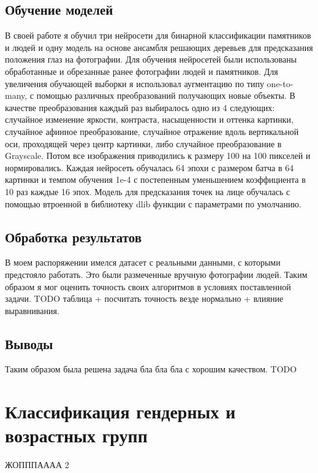 \documentclass[a4paper,14pt]{extarticle}
\begin{document}
    \subsection{Обучение моделей}
    В своей работе я обучил три нейросети для бинарной классификации памятников и людей и одну модель на основе ансамбля решающих деревьев для предсказания положения глаз на фотографии.
    Для обучения нейросетей были использованы обработанные и обрезанные ранее фотографии людей и памятников. Для увеличения обучающей выборки я использовал аугментацию по типу one-to-many, с помощью различных преобразований получающих новые объекты. В качестве преобразования каждый раз выбиралось одно из 4 следующих: случайное изменение яркости, контраста, насыщенности и оттенка картинки, случайное афинное преобразование, случайное отражение вдоль вертикальной оси, проходящей через центр картинки, либо случайное преобразование в Grayscale. Потом все изображения приводились к размеру 100 на 100 пикселей и нормировались.
    Каждая нейросеть обучалась 64 эпохи с размером батча в 64 картинки и темпом обучения 1e-4 с постепенным уменьшением коэффициента в 10 раз каждые 16 эпох.
    Модель для предсказания точек на лице обучалась с помощью втроенной в библиотеку dlib функции с параметрами по умолчанию.

    \subsection{Обработка результатов}
    В моем распоряжении имелся датасет с реальными данными, с которыми предстояло работать. Это были размеченные вручную фотографии людей. Таким образом я мог оценить точность своих алгоритмов в условиях поставленной задачи. TODO таблица + посчитать точность везде нормально + влияние выравнивания.

    \subsection{Выводы}
    Таким образом была решена задача бла бла бла с хорошим качеством. TODO

    \section{Классификация гендерных и возрастных групп}
    ЖОПППАААА 2
    \newpage
\end{document}

